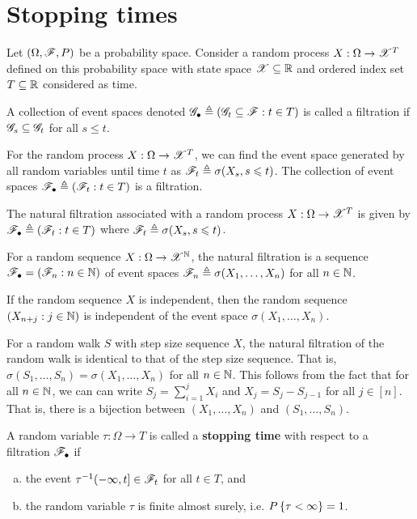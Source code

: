 \documentclass[a4paper,10pt,english]{article}
\begin{document}
\section{Stopping times}
Let $(\Omega, \mathscr{F}, P)$ be a probability space. %
Consider a random process $X:\Omega\to\mathscr{X}^T$ defined on this probability space with state space $\mathscr{X} \subseteq \mathbb{R}$ and ordered index set $T\subseteq \mathbb{R}$ considered as time. 
\begin{defn}
A collection of event spaces denoted $\mathscr{G}_{\bullet} \triangleq (\mathscr{G}_t \subseteq \mathscr{F}: t \in T)$ is called a filtration if $\mathscr{G}_s \subseteq \mathscr{G}_t$ for all $s \le t$. 
\end{defn}
\begin{rem} 
For the random process $X:\Omega\to\mathscr{X}^T$, 
we can find the event space generated by all random variables until time $t$ as $\mathscr{F}_t\triangleq \sigma(X_s, s \leqslant t)$.  
The collection of event spaces $\mathscr{F}_\bullet \triangleq (\mathscr{F}_t: t \in T)$ is a filtration.
\end{rem}
\begin{defn}
The natural filtration associated with a random process $X:\Omega \to \mathscr{X}^T$ is given by $\mathscr{F}_\bullet \triangleq (\mathscr{F}_t: t\in T)$ where $\mathscr{F}_t \triangleq \sigma(X_s, s\leqslant t)$.  
\end{defn}
\begin{rem}
For a random sequence $X: \Omega \to \mathscr{X}^{\mathbb{N}}$, the natural filtration is a sequence $\mathscr{F}_\bullet = (\mathscr{F}_n: n \in \mathbb{N})$ of event spaces $\mathscr{F}_n \triangleq \sigma(X_1, \dots, X_n)$ for all $n \in \mathbb{N}$. 
\end{rem}
\begin{rem}
If the random sequence $X$ is independent, 
then the random sequence $(X_{n+j}: j \in \mathbb{N})$ is independent of the event space $\sigma(X_1, \dots, X_n)$. 
\end{rem}
\begin{shaded}
\begin{exmp} 
For a random walk $S$ with step size sequence $X$, 
the natural filtration of the random walk is identical to that of the step size sequence. 
That is, $\sigma(S_1, \dots, S_n) = \sigma(X_1, \dots, X_n)$ for all $n \in \mathbb{N}$. 
This follows from the fact that for all $n \in \mathbb{N}$, 
we can can write $S_j = \sum_{i=1}^jX_i$ and $X_j = S_j - S_{j-1}$ for all $j \in [n]$. 
That is, there is a bijection between $(X_1, \dots, X_n)$ and $(S_1, \dots, S_n)$. 
\end{exmp}
\end{shaded}
\begin{defn}
\label{defn:StoppingTimeGen}
A random variable $\tau: \Omega \to T$ is called a \textbf{stopping time} with respect to  a filtration $\mathscr{F}_\bullet$ if 
\begin{enumerate}[(a)]
\item the event $\tau^{-1}(-\infty, t] \in \mathscr{F}_t$ for all $t \in T$, and 
\item the random variable $\tau$ is finite almost surely, i.e. $P\left\{\tau < \infty\right\} = 1$.  
\end{enumerate}
\end{defn}
\end{document}
